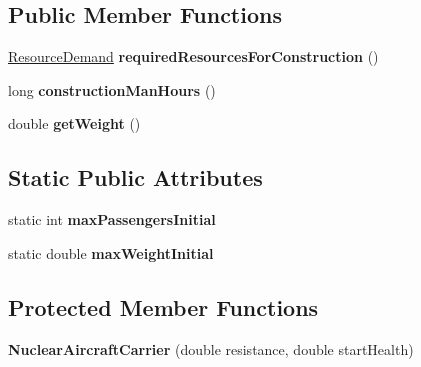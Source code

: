 \subsection*{Public Member Functions}
\begin{DoxyCompactItemize}
\item 
\hyperlink{classuniverse_1_1_resource_demand}{Resource\+Demand} {\bfseries required\+Resources\+For\+Construction} ()\hypertarget{classtools_1_1vehicles_1_1sea_1_1_nuclear_aircraft_carrier_a082886aab0c1214983efe3ca0bbc33f7}{}\label{classtools_1_1vehicles_1_1sea_1_1_nuclear_aircraft_carrier_a082886aab0c1214983efe3ca0bbc33f7}

\item 
long {\bfseries construction\+Man\+Hours} ()\hypertarget{classtools_1_1vehicles_1_1sea_1_1_nuclear_aircraft_carrier_a00eec4cf6e3aa3728c08365c71a2276c}{}\label{classtools_1_1vehicles_1_1sea_1_1_nuclear_aircraft_carrier_a00eec4cf6e3aa3728c08365c71a2276c}

\item 
double {\bfseries get\+Weight} ()\hypertarget{classtools_1_1vehicles_1_1sea_1_1_nuclear_aircraft_carrier_a87b6d5c8f407cae6427ca69d9ea90301}{}\label{classtools_1_1vehicles_1_1sea_1_1_nuclear_aircraft_carrier_a87b6d5c8f407cae6427ca69d9ea90301}

\end{DoxyCompactItemize}
\subsection*{Static Public Attributes}
\begin{DoxyCompactItemize}
\item 
static int {\bfseries max\+Passengers\+Initial}\hypertarget{classtools_1_1vehicles_1_1sea_1_1_nuclear_aircraft_carrier_ab6af86fba6e160894431eca9a3a7b878}{}\label{classtools_1_1vehicles_1_1sea_1_1_nuclear_aircraft_carrier_ab6af86fba6e160894431eca9a3a7b878}

\item 
static double {\bfseries max\+Weight\+Initial}\hypertarget{classtools_1_1vehicles_1_1sea_1_1_nuclear_aircraft_carrier_af417b700593af27071a9ef696eb5d818}{}\label{classtools_1_1vehicles_1_1sea_1_1_nuclear_aircraft_carrier_af417b700593af27071a9ef696eb5d818}

\end{DoxyCompactItemize}
\subsection*{Protected Member Functions}
\begin{DoxyCompactItemize}
\item 
{\bfseries Nuclear\+Aircraft\+Carrier} (double resistance, double start\+Health)\hypertarget{classtools_1_1vehicles_1_1sea_1_1_nuclear_aircraft_carrier_af45b3f078011d51678748a579e61eea4}{}\label{classtools_1_1vehicles_1_1sea_1_1_nuclear_aircraft_carrier_af45b3f078011d51678748a579e61eea4}

\end{DoxyCompactItemize}
